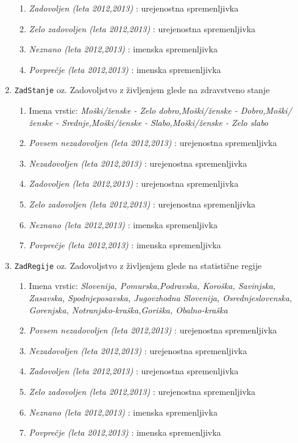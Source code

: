 \documentclass[11pt,a4paper]{article}
\begin{document}
\begin{enumerate}
\begin{enumerate}
\item \textit{Zadovoljen (leta 2012,2013)} : urejenostna spremenljivka
\item \textit{Zelo zadovoljen (leta 2012,2013)} : urejenostna spremenljivka
\item \textit{Neznano (leta 2012,2013)} : imenska spremenljivka
\item \textit{Povprečje (leta 2012,2013)} : imenska spremenljivka
\end{enumerate}
\item \verb+ZadStanje+ oz. Zadovoljstvo z življenjem glede na zdravstveno stanje
\begin{enumerate}
\item Imena vrstic: \textit{Moški/ženske - Zelo dobro,Moški/ženske - Dobro,Moški/ženske - Srednje,Moški/ženske - Slabo,Moški/ženske - Zelo slabo}
\item \textit{Povsem nezadovoljen (leta 2012,2013)} : urejenostna spremenljivka
\item \textit{Nezadovoljen (leta 2012,2013)} : urejenostna spremenljivka
\item \textit{Zadovoljen (leta 2012,2013)} : urejenostna spremenljivka
\item \textit{Zelo zadovoljen (leta 2012,2013)} : urejenostna spremenljivka
\item \textit{Neznano (leta 2012,2013)} : imenska spremenljivka
\item \textit{Povprečje (leta 2012,2013)} : imenska spremenljivka
\end{enumerate}
\item \verb+ZadRegije+ oz. Zadovoljstvo z življenjem glede na statistične regije
\begin{enumerate}
\item Imena vrstic: \textit{Slovenija, Pomurska,Podravska, Koroška, Savinjska, Zasavska, Spodnjeposavska, Jugovzhodna Slovenija, Osrednjeslovenska, Gorenjska, Notranjsko-kraška,Goriška, Obalno-kraška}
\item \textit{Povsem nezadovoljen (leta 2012,2013)} : urejenostna spremenljivka
\item \textit{Nezadovoljen (leta 2012,2013)} : urejenostna spremenljivka
\item \textit{Zadovoljen (leta 2012,2013)} : urejenostna spremenljivka
\item \textit{Zelo zadovoljen (leta 2012,2013)} : urejenostna spremenljivka
\item \textit{Neznano (leta 2012,2013)} : imenska spremenljivka
\item \textit{Povprečje (leta 2012,2013)} : imenska spremenljivka
\end{enumerate}
\end{enumerate}
\end{document}
